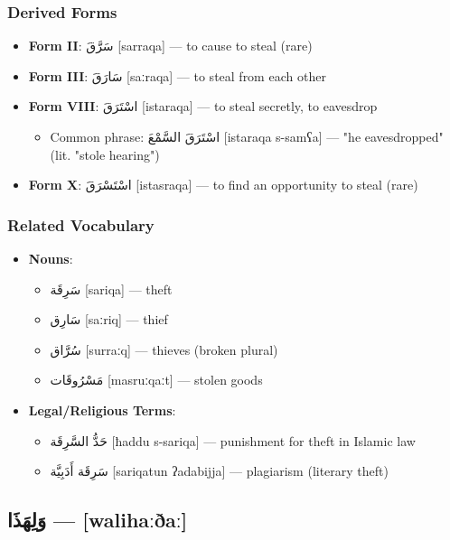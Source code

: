 \documentclass[letterpaper,12pt]{article}
\begin{document}
\subsubsection*{Derived Forms}
\begin{itemize}
  \item \textbf{Form II}: \textarabic{سَرَّقَ} [sarraqa] — to cause to steal (rare)
  \item \textbf{Form III}: \textarabic{سَارَقَ} [saːraqa] — to steal from each other
  \item \textbf{Form VIII}: \textarabic{اسْتَرَقَ} [istaraqa] — to steal secretly, to eavesdrop
    \begin{itemize}
      \item Common phrase: \textarabic{اسْتَرَقَ السَّمْعَ} [istaraqa s-samʕa] — "he eavesdropped" (lit. "stole hearing")
    \end{itemize}
  \item \textbf{Form X}: \textarabic{اسْتَسْرَقَ} [istasraqa] — to find an opportunity to steal (rare)
\end{itemize}

\subsubsection*{Related Vocabulary}
\begin{itemize}
  \item \textbf{Nouns}:
    \begin{itemize}
      \item \textarabic{سَرِقَة} [sariqa] — theft
      \item \textarabic{سَارِق} [saːriq] — thief
      \item \textarabic{سُرَّاق} [surraːq] — thieves (broken plural)
      \item \textarabic{مَسْرُوقَات} [masruːqaːt] — stolen goods
    \end{itemize}
  \item \textbf{Legal/Religious Terms}:
    \begin{itemize}
      \item \textarabic{حَدُّ السَّرِقَة} [ħaddu s-sariqa] — punishment for theft in Islamic law
      \item \textarabic{سَرِقَة أَدَبِيَّة} [sariqatun ʔadabijja] — plagiarism (literary theft)
    \end{itemize}
\end{itemize}
\subsection{\textarabic{وَلِهَذَا} — [walihaːðaː]}
\end{document}
